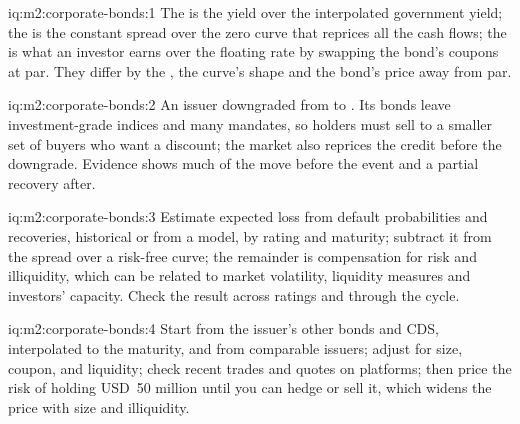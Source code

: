 \begin{solution}{iq:m2:corporate-bonds:1}
The  is the yield over the interpolated government yield; the  is the
constant spread over the zero curve that reprices all the cash flows; the  is what an investor earns over the floating rate by swapping the bond's
coupons at par. They differ by the , the curve's shape and the bond's
price away from par.
\end{solution}

\begin{solution}{iq:m2:corporate-bonds:2}
An issuer downgraded from  to . Its bonds leave
investment-grade indices and many mandates, so holders must sell to a smaller set of
buyers who want a discount; the market also reprices the credit before the downgrade.
Evidence shows much of the move before the event and a partial recovery after.
\end{solution}

\begin{solution}{iq:m2:corporate-bonds:3}
Estimate expected loss from default probabilities and recoveries, historical or
from a model, by rating and maturity; subtract it from the spread over a risk-free
curve; the remainder is compensation for risk and illiquidity, which can be related
to market volatility, liquidity measures and investors' capacity. Check the result
across ratings and through the cycle.
\end{solution}

\begin{solution}{iq:m2:corporate-bonds:4}
Start from the issuer's other bonds and CDS, interpolated to the maturity, and from
comparable issuers; adjust for size, coupon,  and liquidity; check recent
trades and quotes on platforms; then price the risk of holding USD~50 million until
you can hedge or sell it, which widens the price with size and illiquidity.
\end{solution}

